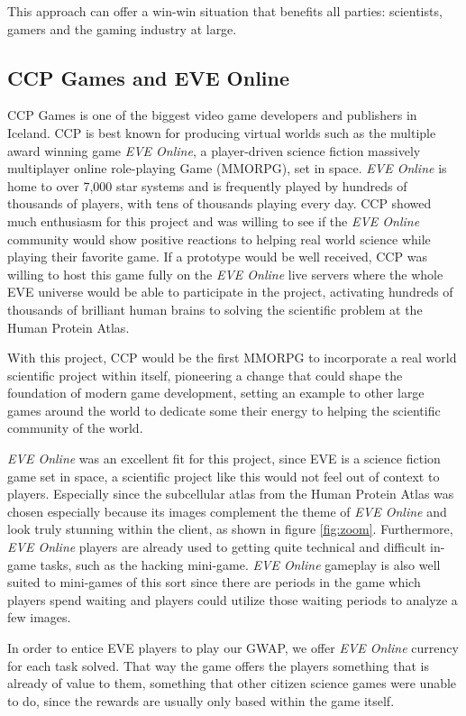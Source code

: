 This approach can offer a win-win situation that benefits all parties: scientists, gamers and the gaming industry at large.

\subsection{CCP Games and EVE Online}

CCP Games is one of the biggest video game developers and publishers in Iceland. CCP is best known for producing virtual worlds such as the multiple award winning game \emph{EVE Online}, a player-driven science fiction massively multiplayer online role-playing Game (MMORPG), set in space. \emph{EVE Online} is home to over 7,000 star systems and is frequently played by hundreds of thousands of players, with tens of thousands playing every day. CCP showed much enthusiasm for this project and was willing to see if the \emph{EVE Online} community would show positive reactions to helping real world science while playing their favorite game. If a prototype would be well received, CCP was willing to host this game fully on the \emph{EVE Online} live servers where the whole EVE universe would be able to participate in the project, activating hundreds of thousands of brilliant human brains to solving the scientific problem at the Human Protein Atlas.

With this project, CCP would be the first MMORPG to incorporate a real world scientific project within itself, pioneering a change that could shape the foundation of modern game development, setting an example to other large games around the world to dedicate some their energy to helping the scientific community of the world.

\emph{EVE Online} was an excellent fit for this project, since EVE is a science fiction game set in space, a scientific project like this would not feel out of context to players. Especially since the subcellular atlas from the Human Protein Atlas was chosen especially because its images complement the theme of \emph{EVE Online} and look truly stunning within the client, as shown in figure \ref{fig:zoom}. Furthermore, \emph{EVE Online} players are already used to getting quite technical and difficult in-game tasks, such as the hacking mini-game. \emph{EVE Online} gameplay is also well suited to mini-games of this sort since there are periods in the game which players spend waiting and players could utilize those waiting periods to analyze a few images.

In order to entice EVE players to play our GWAP, we offer \emph{EVE Online} currency for each task solved. That way the game offers the players something that is already of value to them, something that other citizen science games were unable to do, since the rewards are usually only based within the game itself.

